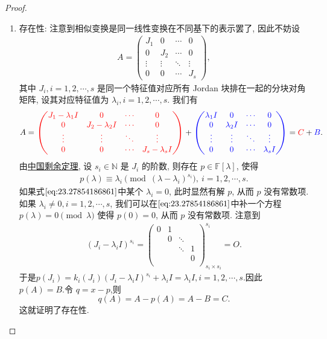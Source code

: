 \documentclass[../../main.tex]{subfiles}
\begin{document}
\begin{proof}
\begin{enumerate}
\item {\heiti 存在性:} 注意到相似变换是同一线性变换在不同基下的表示罢了, 因此不妨设
\begin{align*}
A = \begin{pmatrix}
J_1 & 0 & \cdots & 0 \\
0 & J_2 & \cdots & 0 \\
\vdots & \vdots & \ddots & \vdots \\
0 & 0 & \cdots & J_s
\end{pmatrix},
\end{align*}
其中 \( J_i, i = 1, 2, \cdots, s \) 是同一个特征值对应所有 Jordan 块排在一起的分块对角矩阵, 设其对应特征值为 \( \lambda_i, i = 1, 2, \cdots, s \).
我们有
\[
A = {\color{red} \begin{pmatrix}
J_1 - \lambda_1 I & 0 & \cdots & 0 \\
0 & J_2 - \lambda_2 I & \cdots & 0 \\
\vdots & \vdots & \ddots & \vdots \\
0 & 0 & \cdots & J_s - \lambda_s I
\end{pmatrix}} + {\color{blue} \begin{pmatrix}
\lambda_1 I & 0 & \cdots & 0 \\
0 & \lambda_2 I & \cdots & 0 \\
\vdots & \vdots & \ddots & \vdots \\
0 & 0 & \cdots & \lambda_s I
\end{pmatrix}} = {\color{red} C} + {\color{blue} B}.
\]
由\hyperref[theorem:中国剩余定理(多项式版)]{中国剩余定理}, 设 \( s_i \in \mathbb{N} \) 是 \( J_i \) 的阶数, 则存在 \( p \in \mathbb{F}[\lambda] \), 使得
\begin{align}
p(\lambda) \equiv \lambda_i \pmod{(\lambda - \lambda_i)^{s_i}},\ i = 1, 2, \cdots, s. \label{eq:23.27854186861}
\end{align}
如果式\(\eqref{eq:23.27854186861}\)中某个 \( \lambda_i = 0 \), 此时显然有解 \( p \), 从而 \( p \) 没有常数项. 如果 \( \lambda_i \neq 0, i = 1, 2, \cdots, s \), 我们可以在\(\eqref{eq:23.27854186861}\)中补一个方程 \( p(\lambda) = 0 \pmod{\lambda} \) 使得 \( p(0) = 0 \), 从而 \( p \) 没有常数项.
注意到
\begin{align*}
\left( J_i-\lambda _iI \right) ^{s_i}=\left( \begin{matrix}
0&		1&		&		\\
&		0&		\ddots&		\\
&		&		\ddots&		1\\
&		&		&		0\\
\end{matrix} \right) _{s_i\times s_i}^{s_i}=O.
\end{align*}
于是$p(J_i)=k_i\left( J_i \right) \left( J_i-\lambda _iI \right) ^{s_i}+\lambda _iI=\lambda _iI,i=1,2,\cdots ,s.$因此 \( p(A) = B.\)令 \( q = x - p \),则
\[
 q(A) = A-p(A)=A-B=C.
\]
这就证明了存在性.


\end{enumerate}
\end{proof}
\end{document}
